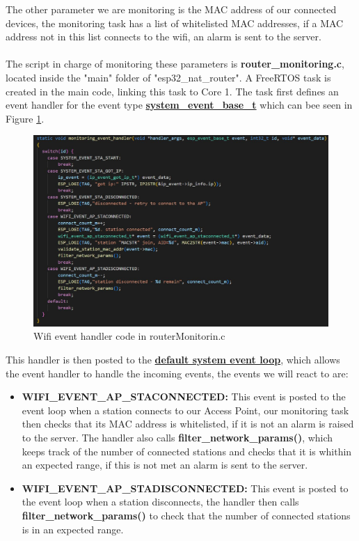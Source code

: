 The other parameter we are monitoring is the MAC address of our connected devices, the monitoring task has a list of whitelisted MAC addresses, if a MAC address not in this list connects to the wifi, an alarm is sent to the server.\\~\\

The script in charge of monitoring these parameters is \textbf{router\_monitoring.c}, located inside the "main" folder of "esp32\_nat\_router". A FreeRTOS task is created in the main code, linking this task to Core 1. The task first defines an event handler for the event type \href{https://docs.espressif.com/projects/esp-idf/en/latest/esp32/api-reference/system/esp_event.html}{\textbf{system\_event\_base\_t}} which can bee seen in Figure \ref{fig:wifi_event_handler}. 

\begin{figure}[H]
\centering
\includegraphics[width=.9\linewidth]{images/wifi_event_handler_code.JPG}
\caption{Wifi event handler code in routerMonitorin.c}
\label{fig:wifi_event_handler}
\end{figure}

This handler is then posted to the \href{https://docs.espressif.com/projects/esp-idf/en/latest/esp32/api-reference/system/esp_event.html}{\textbf{default system event loop}}, which allows the event handler to handle the incoming events, the events we will react to are:

\begin{itemize}
    \item \textbf{WIFI\_EVENT\_AP\_STACONNECTED: } This event is posted to the event loop when a station connects to our Access Point, our monitoring task then checks that its MAC address is whitelisted, if it is not an alarm is raised to the server. The handler also calls \textbf{filter\_network\_params()}, which keeps track of the number of connected stations and checks that it is whithin an expected range, if this is not met an alarm is sent to the server.
    
    \item \textbf{WIFI\_EVENT\_AP\_STADISCONNECTED: } This event is posted to the event loop when a station disconnects, the handler then calls \textbf{filter\_network\_params()} to check that the number of connected stations is in an expected range.
    
\end{itemize}

